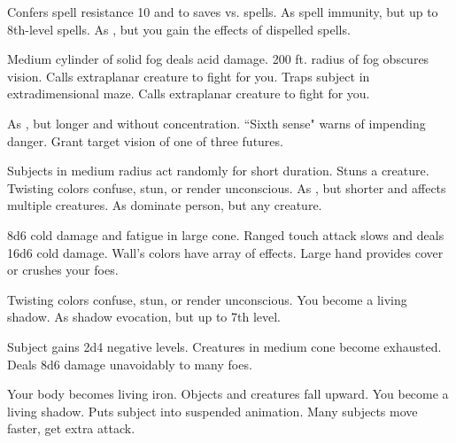 \begin{swspelllist}
\M\F Confers spell resistance 10 and  to saves vs. spells.
 As spell immunity, but up to 8th-level spells.
 As , but you gain the effects of dispelled spells.

 Medium cylinder of solid fog deals acid damage.
 200 ft. radius of fog obscures vision.
 Calls extraplanar creature to fight for you.
 Traps subject in extradimensional maze.
 Calls extraplanar creature to fight for you.

 As , but longer and without concentration.
 ``Sixth sense" warns of impending danger.
 Grant target vision of one of three futures.

 Subjects in medium radius act randomly for short duration.
 Stuns a creature.
 Twisting colors confuse, stun, or render unconscious.
 As , but shorter and affects multiple creatures.
 As dominate person, but any creature.

 8d6 cold damage and fatigue in large cone.
 Ranged touch attack slows and deals 16d6 cold damage.
 Wall's colors have array of effects.
 Large hand provides cover or crushes your foes.

 Twisting colors confuse, stun, or render unconscious.
 You become a living shadow.
 As shadow evocation, but up to 7th level.

 Subject gains 2d4 negative levels.
 Creatures in medium cone become exhausted.
 Deals 8d6 damage unavoidably to many foes.

 Your body becomes living iron.
 Objects and creatures fall upward.
 You become a living shadow.
\M Puts subject into suspended animation.
 Many subjects move faster, get extra attack.
\end{swspelllist}

